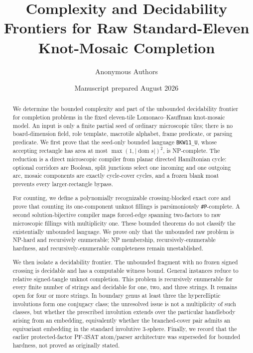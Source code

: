 \documentclass[11pt]{article}
\title{Complexity and Decidability Frontiers for Raw Standard-Eleven Knot-Mosaic Completion}
\author{Anonymous Authors}
\date{Manuscript prepared August 2026}
\begin{document}
\maketitle
\begin{abstract}
We determine the bounded complexity and part of the unbounded decidability
frontier for completion problems in the fixed eleven-tile
Lomonaco--Kauffman knot-mosaic model.  An input is only a finite partial seed
of ordinary microscopic tiles; there is no board-dimension field, role
template, macrotile alphabet, frame predicate, or parsing predicate.  We first
prove that the seed-only bounded language \texttt{BKW11\_U}, whose accepting rectangle
has area at most $\max(1,|\operatorname{dom}s|)^2$, is NP-complete.  The reduction is a direct
microscopic compiler from planar directed Hamiltonian cycle: optional
corridors are Boolean, split junctions select one incoming and one outgoing
arc, mosaic components are exactly cycle-cover cycles, and a frozen blank moat
prevents every larger-rectangle bypass.

For counting, we define a polynomially recognizable crossing-blocked exact
core and prove that counting its one-component unknot fillings is
parsimoniously \texttt{\#P}-complete.  A second solution-bijective compiler maps
forced-edge spanning two-factors to raw microscopic fillings with multiplicity
one.  These bounded theorems do not classify the existentially unbounded
language.  We prove only that the unbounded raw problem is NP-hard and
recursively enumerable; NP membership, recursively-enumerable hardness, and
recursively-enumerable completeness remain unestablished.

We then isolate a decidability frontier.  The unbounded fragment with no
frozen signed crossing is decidable and has a computable witness bound.
General instances reduce to relative signed-tangle unknot completion.  This
problem is recursively enumerable for every finite number of strings and
decidable for one, two, and three strings.  It remains open for four or more
strings.  In boundary genus at least three the hyperelliptic involutions form
one conjugacy class; the unresolved issue is not a multiplicity of such
classes, but whether the prescribed involution extends over the particular
handlebody arising from an embedding, equivalently whether the branched-cover
pair admits an equivariant embedding in the standard involutive 3-sphere.
Finally, we record that the earlier protected-factor PF-3SAT atom/parser
architecture was superseded for bounded hardness, not proved as originally
stated.
\end{abstract}
\end{document}
